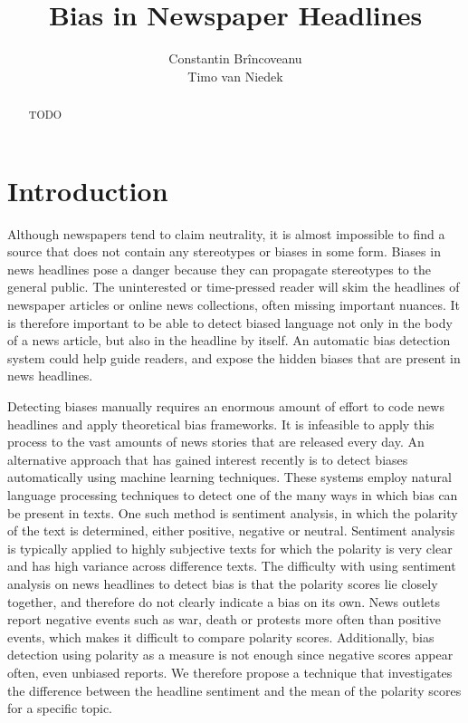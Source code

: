 \documentclass[final]{ieee}
\title[Cognitive Computational Modeling of Language and Web Interaction]{Bias in Newspaper Headlines}
\author[Br\^{i}ncoveanu \& van Niedek]{%
   Constantin Br\^{i}ncoveanu \\
   Timo van Niedek
    \authorinfo{%
     Cognitive Computational Modeling of Language and Web Interaction,\\
      SOW-MKI61-2016-SEM2-V, 13th July 2017, Dr. G.E. Kachergis. \\
      email: \mbox{c.brincoveanu@student.ru.nl},\mbox{timo.niedek@student.ru.nl}} 
}
\begin{document}
\maketitle


\begin{abstract}
TODO
\end{abstract}

\section{Introduction}\label{sec:intro}

Although newspapers tend to claim neutrality, it is almost impossible to find a source that does not contain any stereotypes or biases in some form. Biases in news headlines pose a danger because they can propagate stereotypes to the general public. The uninterested or time-pressed reader will skim the headlines of newspaper articles or online news collections, often missing important nuances. It is therefore important to be able to detect biased language not only in the body of a news article, but also in the headline by itself. An automatic bias detection system could help guide readers, and expose the hidden biases that are present in news headlines.

Detecting biases manually requires an enormous amount of effort to code news headlines and apply theoretical bias frameworks. It is infeasible to apply this process to the vast amounts of news stories that are released every day. An alternative approach that has gained interest recently is to detect biases automatically using machine learning techniques. These systems employ natural language processing techniques to detect one of the many ways in which bias can be present in texts. One such method is sentiment analysis, in which the polarity of the text is determined, either positive, negative or neutral. Sentiment analysis is typically applied to highly subjective texts for which the polarity is very clear and has high variance across difference texts. The difficulty with using sentiment analysis on news headlines to detect bias is that the polarity scores lie closely together, and therefore do not clearly indicate a bias on its own. News outlets report negative events such as war, death or protests more often than positive events, which makes it difficult to compare polarity scores. Additionally, bias detection using polarity as a measure is not enough since negative scores appear often, even unbiased reports. We therefore propose a technique that investigates the difference between the headline sentiment and the mean of the polarity scores for a specific topic. 
\end{document}
